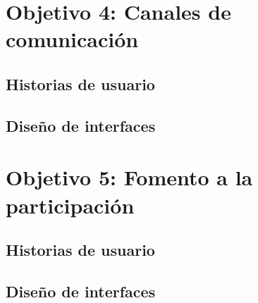 \section{Objetivo 4: Canales de comunicación}
\subsection{Historias de usuario}
\subsection{Diseño de interfaces}

\section{Objetivo 5: Fomento a la participación}
\subsection{Historias de usuario}
\subsection{Diseño de interfaces}
